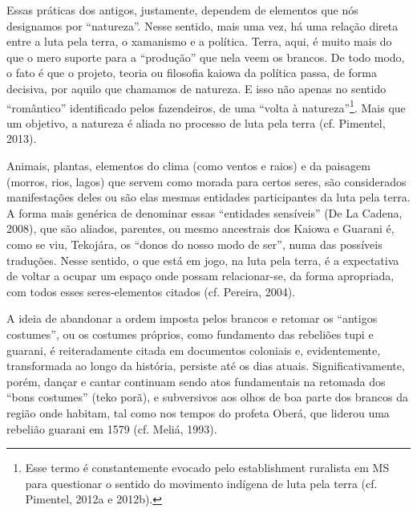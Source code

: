 \documentclass{article}
\begin{document}
Essas pr\'aticas dos antigos, justamente, dependem de elementos que
n\'os designamos por {\textquotedblleft}natureza{\textquotedblright}.
Nesse sentido, mais uma vez, h\'a uma rela\c{c}\~ao direta entre a luta
pela terra, o xamanismo e a pol\'itica. Terra, aqui, \'e muito mais do
que o mero suporte para a
{\textquotedblleft}produ\c{c}\~ao{\textquotedblright} que nela veem os
brancos. De todo modo, o fato \'e que o projeto, teoria ou filosofia
kaiowa da pol\'itica passa, de forma decisiva, por aquilo que chamamos
de natureza. E isso n\~ao apenas no sentido
{\textquotedblleft}rom\^antico{\textquotedblright} identificado pelos
fazendeiros, de uma {\textquotedblleft}volta \`a
natureza{\textquotedblright}\footnote{ Esse termo \'e constantemente
evocado pelo establishment ruralista em MS para questionar o sentido do
movimento ind\'igena de luta pela terra (cf. Pimentel, 2012a e
2012b).}. Mais que um objetivo, a natureza \'e aliada no processo de
luta pela terra (cf. Pimentel, 2013).

Animais, plantas, elementos do clima (como ventos e raios) e da paisagem
(morros, rios, lagos) que servem como morada para certos seres, s\~ao
considerados manifesta\c{c}\~oes deles ou s\~ao elas mesmas entidades
participantes da luta pela terra. A forma mais gen\'erica de denominar
essas {\textquotedblleft}entidades sens\'iveis{\textquotedblright} (De
La Cadena, 2008), que s\~ao aliados, parentes, ou mesmo ancestrais dos
Kaiowa e Guarani \'e, como se viu, Tekoj\'ara, os
{\textquotedblleft}donos do nosso modo de ser{\textquotedblright}, numa
das poss\'iveis tradu\c{c}\~oes. Nesse sentido, o que est\'a em jogo,
na luta pela terra, \'e a expectativa de voltar a ocupar um espa\c{c}o
onde possam relacionar-se, da forma apropriada, com todos esses
seres-elementos citados (cf. Pereira, 2004).

A ideia de abandonar a ordem imposta pelos brancos e retomar os
{\textquotedblleft}antigos costumes{\textquotedblright}, ou os costumes
pr\'oprios, como fundamento das rebeli\~oes tupi e guarani, \'e
reiteradamente citada em documentos coloniais e, evidentemente,
transformada ao longo da hist\'oria, persiste at\'e os dias atuais.
Significativamente, por\'em, dan\c{c}ar e cantar continuam sendo atos
fundamentais na retomada dos {\textquotedblleft}bons
costumes{\textquotedblright} (teko por\~a), e subversivos aos olhos de
boa parte dos brancos da regi\~ao onde habitam, tal como nos tempos do
profeta Ober\'a, que liderou uma rebeli\~ao guarani em 1579 (cf.
Meli\'a, 1993).
\end{document}
